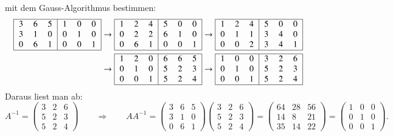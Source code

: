 mit dem Gauss-Algorithmus bestimmen:
\begin{align*}
\begin{tabular}{|ccc|ccc|}
\hline
3&6&5&1&0&0\\
3&1&0&0&1&0\\
0&6&1&0&0&1\\
\hline
\end{tabular}
&
\rightarrow
\begin{tabular}{|ccc|ccc|}
\hline
1&2&4&5&0&0\\
0&2&2&6&1&0\\
0&6&1&0&0&1\\
\hline
\end{tabular}
\rightarrow
\begin{tabular}{|ccc|ccc|}
\hline
1&2&4&5&0&0\\
0&1&1&3&4&0\\
0&0&2&3&4&1\\
\hline
\end{tabular}
\\
&
\rightarrow
\begin{tabular}{|ccc|ccc|}
\hline
1&2&0&6&6&5\\
0&1&0&5&2&3\\
0&0&1&5&2&4\\
\hline
\end{tabular}
\rightarrow
\begin{tabular}{|ccc|ccc|}
\hline
1&0&0&3&2&6\\
0&1&0&5&2&3\\
0&0&1&5&2&4\\
\hline
\end{tabular}
\end{align*}
Daraus liest man ab:
\[
A^{-1}
=
\begin{pmatrix}
3&2&6\\
5&2&3\\
5&2&4
\end{pmatrix}
\qquad
\Rightarrow
\qquad
AA^{-1}
=
\begin{pmatrix}
3&6&5\\
3&1&0\\
0&6&1
\end{pmatrix}
\begin{pmatrix}
3&2&6\\
5&2&3\\
5&2&4
\end{pmatrix}
=
\begin{pmatrix}
64&28&56\\
14& 8&21\\
35&14&22
\end{pmatrix}
=
\begin{pmatrix}
1&0&0\\
0&1&0\\
0&0&1
\end{pmatrix}.
\]
